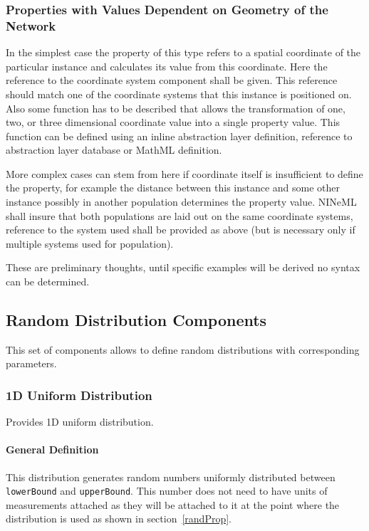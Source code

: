 \documentclass{article}
\begin{document}
\subsubsection{Properties with Values Dependent on Geometry of the Network}

In the simplest case the property of this type refers to a spatial coordinate
of the particular instance and calculates its value from this coordinate.
Here the reference to the coordinate system component shall be given. This reference
should match one of the coordinate systems that this instance is positioned on.
Also some function has to be described that allows the transformation of one, two,
or three dimensional coordinate value into a single property value. This
function can be defined using an inline abstraction layer definition, reference
to abstraction layer database or MathML definition.

More complex cases can stem from here if coordinate itself is insufficient to
define the property, for example the distance between this instance and some other
instance possibly in another population determines the property value. NINeML
shall insure that both populations are laid out on the same coordinate systems,
reference to the system used shall be provided as above (but is necessary only
if multiple systems used for population).

These are preliminary thoughts, until specific examples will be derived no syntax
can be determined.

\subsection{Random Distribution Components}
\label{randDist}

This set of components allows to define random distributions with corresponding
parameters.

\subsubsection{1D Uniform Distribution}
\label{uniform1D}

Provides 1D uniform distribution.

\paragraph{General Definition}
This distribution generates random numbers uniformly distributed between
{\tt lowerBound} and {\tt upperBound}. This number does not need to have
units of measurements attached as they will be attached to it at the
point where the distribution is used as shown in section~\ref{randProp}.
\end{document}
